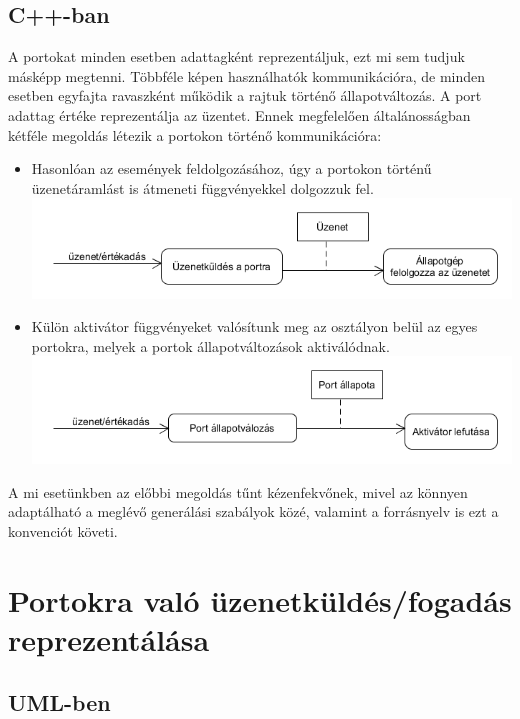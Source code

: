\documentclass[a4paper,12pt]{report}
\begin{document}
\subsection{C++-ban}
A portokat minden esetben adattagként reprezentáljuk, ezt mi sem tudjuk másképp megtenni. Többféle képen használhatók kommunikációra, de minden esetben egyfajta ravaszként működik a rajtuk történő állapotváltozás. A port adattag értéke reprezentálja az üzentet. Ennek megfelelően általánosságban kétféle megoldás létezik a portokon történő kommunikációra:
\begin{itemize}
\item Hasonlóan az események feldolgozásához, úgy a portokon történű üzenetáramlást is átmeneti függvényekkel dolgozzuk fel.
\includegraphics[scale=0.6]{port_actfun.png}
\item Külön aktivátor függvényeket valósítunk meg az osztályon belül az egyes portokra, melyek a portok állapotváltozások aktiválódnak. 
\includegraphics[scale=0.6]{port_sendm.png} \\
\end{itemize}

A mi esetünkben az előbbi megoldás tűnt kézenfekvőnek, mivel az könnyen adaptálható a meglévő generálási szabályok közé, valamint a forrásnyelv is ezt a konvenciót követi. 

\section{Portokra való üzenetküldés/fogadás reprezentálása} \label{message}
\subsection{UML-ben}
\end{document}
